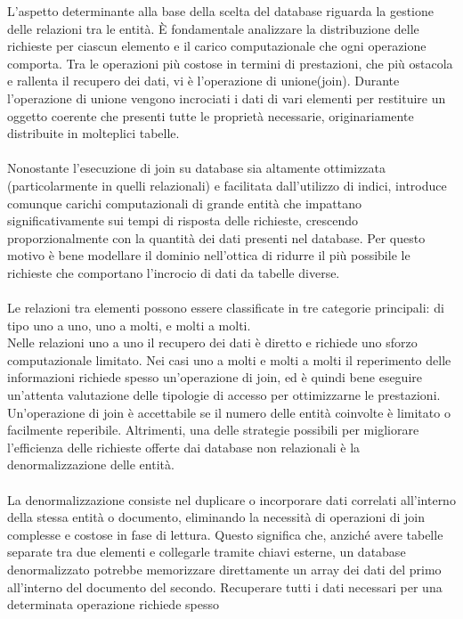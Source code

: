 L'aspetto determinante alla base della scelta del database 
riguarda la gestione delle relazioni tra le entità. 
È fondamentale analizzare la distribuzione delle richieste per ciascun elemento
e il carico computazionale che ogni operazione comporta. 
Tra le operazioni più costose in termini di prestazioni, 
che più ostacola e rallenta il recupero dei dati, vi è l'operazione di unione(join).
Durante l'operazione di unione vengono incrociati i dati di vari elementi 
per restituire un oggetto coerente che presenti tutte le proprietà necessarie, 
originariamente distribuite in molteplici tabelle. \\
\\
Nonostante l'esecuzione di join su database sia altamente ottimizzata
(particolarmente in quelli relazionali) e facilitata dall'utilizzo di indici,
introduce comunque carichi computazionali di grande entità che impattano
significativamente sui tempi di risposta delle richieste, 
crescendo proporzionalmente con la quantità dei dati presenti nel database. 
Per questo motivo è bene modellare il dominio nell'ottica di ridurre il più possibile 
le richieste che comportano l'incrocio di dati da tabelle diverse.\\
\\
Le relazioni tra elementi possono essere classificate in tre categorie principali: 
di tipo uno a uno, uno a molti, e molti a molti. \\
Nelle relazioni uno a uno il recupero dei dati è diretto 
e richiede uno sforzo computazionale limitato. 
Nei casi uno a molti e molti a molti il reperimento delle informazioni richiede 
spesso un'operazione di join, ed è quindi bene eseguire un'attenta valutazione 
delle tipologie di accesso per ottimizzarne le prestazioni.
Un'operazione di join è accettabile se il numero delle entità coinvolte è limitato o facilmente reperibile.
Altrimenti, una delle strategie possibili per migliorare l’efficienza delle richieste 
offerte dai database non relazionali è la denormalizzazione delle entità.\\
\\
La denormalizzazione consiste nel duplicare o incorporare dati correlati all'interno della stessa entità o documento, 
eliminando la necessità di operazioni di join complesse e costose in fase di lettura. 
Questo significa che, anziché avere tabelle separate tra due elementi e collegarle tramite chiavi esterne, 
un database denormalizzato potrebbe memorizzare direttamente 
un array dei dati del primo all'interno del documento del secondo.
Recuperare tutti i dati necessari per una determinata operazione richiede spesso 
